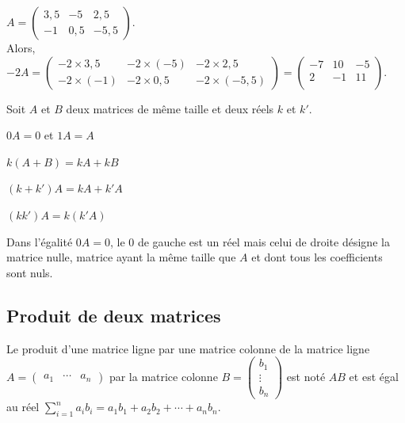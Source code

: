 \documentclass{cornouaille}
\begin{document}
\begin{exemple}
$A=\begin{pmatrix}
3,5 & -5 & 2,5\\
-1 & 0,5 & -5,5
\end{pmatrix}$.\\
Alors, $-2A=\begin{pmatrix}
-2\times3,5 & -2\times(-5) & -2\times2,5\\
-2\times(-1) & -2\times0,5 & -2\times(-5,5)
\end{pmatrix}=\begin{pmatrix}
-7 & 10 & -5 \\
2 & -1 & 11  \\
\end{pmatrix}$.
\end{exemple}


\begin{propriete}
Soit $A$ et $B$ deux matrices de même taille et deux réels $k$ et $k'$.
\begin{colitemize}{2}
\item $0A=0$ et $1A=A$
\item $k(A+B)=kA+kB$
\item $(k+k')A=kA+k'A$
\item $(kk')A=k(k'A)$
\end{colitemize}
\end{propriete}


\begin{remarque}
Dans l'égalité $0A=0$, le $0$ de gauche est un réel mais celui de droite désigne la matrice nulle,
matrice ayant la même taille que $A$ et dont tous les coefficients sont nuls.
\end{remarque}

\subsection{Produit de deux matrices}

\begin{definition}
Le produit d'une matrice ligne par une matrice colonne de la matrice ligne $A=\begin{pmatrix}
a_1 &  \cdots & a_n
\end{pmatrix}$   par la matrice colonne \mbox{$B=\begin{pmatrix}
b_1\\ \vdots \\ b_n \end{pmatrix}$}  est noté $AB$ et est égal au réel $\displaystyle\sum_{i=1}^na_ib_i=a_1b_1+a_2b_2+\cdots+a_nb_n$.
\end{definition}
\end{document}
